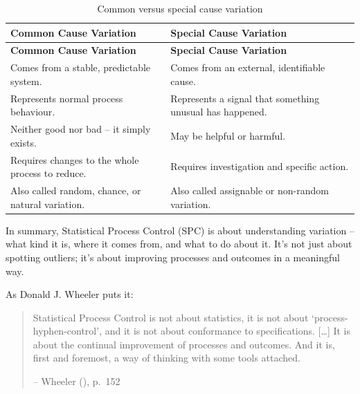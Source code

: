 \documentclass[
]{book}
\begin{document}
\begin{longtable}[]{@{}
  >{\raggedright\arraybackslash}p{}
  >{\raggedright\arraybackslash}p{}@{}}
\caption{Common versus special cause variation}\tabularnewline
\toprule\noalign{}
\begin{minipage}[b]{\linewidth}\raggedright
\textbf{Common Cause Variation}
\end{minipage} & \begin{minipage}[b]{\linewidth}\raggedright
\textbf{Special Cause Variation}
\end{minipage} \\
\midrule\noalign{}
\endfirsthead
\toprule\noalign{}
\begin{minipage}[b]{\linewidth}\raggedright
\textbf{Common Cause Variation}
\end{minipage} & \begin{minipage}[b]{\linewidth}\raggedright
\textbf{Special Cause Variation}
\end{minipage} \\
\midrule\noalign{}
\endhead
\bottomrule\noalign{}
\endlastfoot
Comes from a stable, predictable system. & Comes from an external, identifiable cause. \\
Represents normal process behaviour. & Represents a signal that something unusual has happened. \\
Neither good nor bad -- it simply exists. & May be helpful or harmful. \\
Requires changes to the whole process to reduce. & Requires investigation and specific action. \\
Also called random, chance, or natural variation. & Also called assignable or non-random variation. \\
\end{longtable}

In summary, Statistical Process Control (SPC) is about understanding variation -- what kind it is, where it comes from, and what to do about it. It's not just about spotting outliers; it's about improving processes and outcomes in a meaningful way.

As Donald J. Wheeler puts it:

\begin{quote}
Statistical Process Control is not about statistics, it is not about `process-hyphen-control', and it is not about conformance to specifications. {[}\ldots{]} It is about the continual improvement of processes and outcomes. And it is, first and foremost, a way of thinking with some tools attached.

-- Wheeler (), p.~152
\end{quote}
\end{document}
